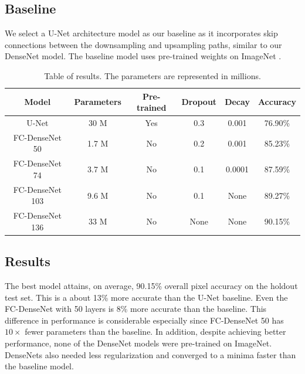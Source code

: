 \documentclass{llncs}
\begin{document}
\subsection{Baseline}
We select a U-Net \cite{U-Net} architecture model as our baseline as it incorporates skip connections between the downsampling and upsampling paths, similar to our DenseNet model. The baseline model uses pre-trained weights on ImageNet \cite{Imagenet}.   

\setlength{\tabcolsep}{3pt}
\begin{table}
	\centering
	\begin{tabular}{ c | c | c | c | c | c}
		\hline
		Model & Parameters & Pre-trained & Dropout & Decay & Accuracy \\ 
		\hline
		U-Net & 30 M & Yes & 0.3 & 0.001 & 76.90\% \\ 
		FC-DenseNet 50 & 1.7 M & No & 0.2 & 0.001 & 85.23\% \\ 
		FC-DenseNet 74 & 3.7 M & No & 0.1 & 0.0001 & 87.59\% \\ 
		FC-DenseNet 103 & 9.6 M & No & 0.1 & None & 89.27\% \\
		FC-DenseNet 136 & 33 M & No & None & None & 90.15\% \\
	\end{tabular}
	\bigskip
	\caption{Table of results. The parameters are represented in millions.}
	\vspace{-3em}
\end{table}


\subsection{Results}
The best model attains, on average, 90.15\% overall pixel accuracy on the holdout test set. This is a about 13\% more accurate than the U-Net baseline. Even the FC-DenseNet with 50 layers is 8\% more accurate than the baseline. This difference in performance is considerable especially since FC-DenseNet 50 has $10 \times$ fewer parameters than the baseline. In addition, despite achieving better performance, none of the DenseNet models were pre-trained on ImageNet. DenseNets also needed less regularization and converged to a minima faster than the baseline model.
\end{document}
